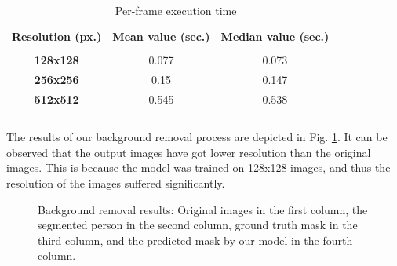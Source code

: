 \documentclass[english]{sbrt}
\begin{document}
\begin{table}[H]
\centering
\caption{Per-frame execution time}
\begin{tabular}{cccl}
\textbf{Resolution (px.)}     & \textbf{Mean value (sec.)}    & \textbf{Median value (sec.)}  &   \\
\\
\hline
\textbf{128x128}              & 0.077                & 0.073                &   \\
\textbf{256x256}              & 0.15                 & 0.147                &   \\
\textbf{512x512}              & 0.545                & 0.538                &   \\
\hline
\multicolumn{1}{l}{} & \multicolumn{1}{l}{} & \multicolumn{1}{l}{} &   \\
\multicolumn{1}{l}{} & \multicolumn{1}{l}{} & \multicolumn{1}{l}{} &  
\label{tab:table1}
\end{tabular}
\end{table}


The results of our background removal process are depicted in Fig. \ref{fig:fig6}. It can be observed that the output images have got lower resolution than the original images. This is because the model was trained on 128x128 images, and thus the resolution of the images suffered significantly.

\begin{figure}[hbt]
\centering 
{}
\caption{\label{fig:fig6} Background removal results: Original images in the first column, the segmented person in the second column, ground truth mask in the third column, and the predicted mask by our model in the fourth column.}
\end{figure}
\end{document}
